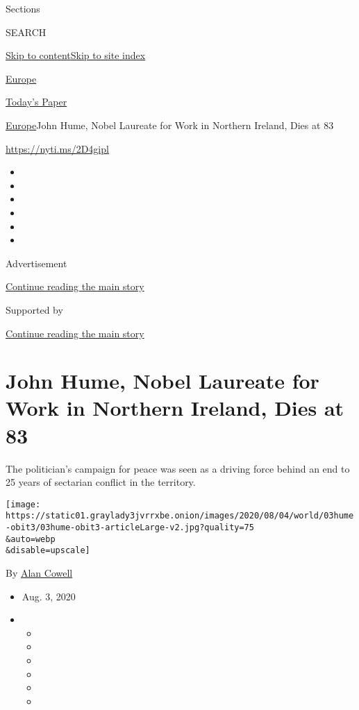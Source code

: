 Sections

SEARCH

\protect\hyperlink{site-content}{Skip to
content}\protect\hyperlink{site-index}{Skip to site index}

\href{https://www.nytimes3xbfgragh.onion/section/world/europe}{Europe}

\href{https://myaccount.nytimes3xbfgragh.onion/auth/login?response_type=cookie\&client_id=vi}{}

\href{https://www.nytimes3xbfgragh.onion/section/todayspaper}{Today's
Paper}

\href{/section/world/europe}{Europe}\textbar{}John Hume, Nobel Laureate
for Work in Northern Ireland, Dies at 83

\href{https://nyti.ms/2D4gipl}{https://nyti.ms/2D4gipl}

\begin{itemize}
\item
\item
\item
\item
\item
\item
\end{itemize}

Advertisement

\protect\hyperlink{after-top}{Continue reading the main story}

Supported by

\protect\hyperlink{after-sponsor}{Continue reading the main story}

\hypertarget{john-hume-nobel-laureate-for-work-in-northern-ireland-dies-at-83}{%
\section{John Hume, Nobel Laureate for Work in Northern Ireland, Dies at
83}\label{john-hume-nobel-laureate-for-work-in-northern-ireland-dies-at-83}}

The politician's campaign for peace was seen as a driving force behind
an end to 25 years of sectarian conflict in the territory.

\texttt{[image: https://static01.graylady3jvrrxbe.onion/images/2020/08/04/world/03hume-obit3/03hume-obit3-articleLarge-v2.jpg?quality=75\\\&auto=webp\\\&disable=upscale]}

By \href{https://www.nytimes3xbfgragh.onion/by/alan-cowell}{Alan Cowell}

\begin{itemize}
\item
  Aug. 3, 2020
\item
  \begin{itemize}
  \item
  \item
  \item
  \item
  \item
  \item
  \end{itemize}
\end{itemize}

